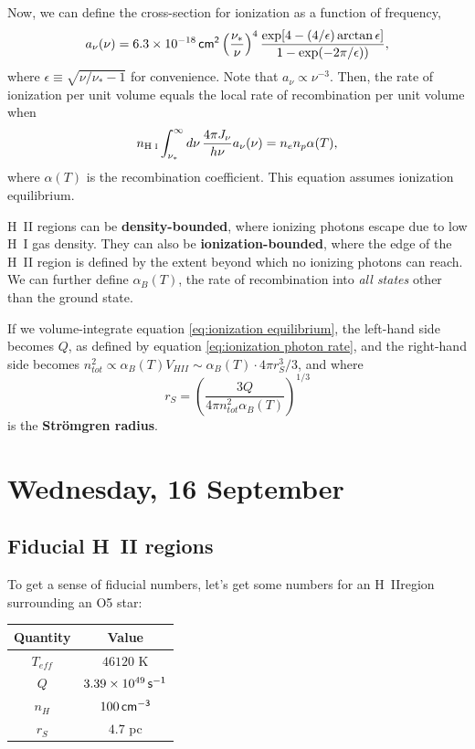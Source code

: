 \documentclass{tufte-handout}
\renewcommand{\textbf}[1]{{\bf \textcolor{dark-gray}{#1}}}
\renewcommand{\rm}{\sf}
\newcommand{\HI}{\textnormal{H{\smaller~\textsc{I}}}}
\newcommand{\HII}{\textnormal{H{\smaller~\textsc{II}}}}
\begin{document}
Now, we can define the cross-section for ionization as a function of frequency,
\begin{equation}
a_\nu(\nu) = 6.3 \times 10^{-18} {\rm\, cm^2} \left (\frac{\nu_*}{\nu}\right )^4 \frac{\exp[4 -(4/\epsilon)\arctan \epsilon]}{1 - \exp(-2\pi/\epsilon))},
\end{equation}
where $\epsilon \equiv \sqrt{\nu / \nu_* - 1}$ for convenience. Note that $a_\nu \propto \nu^{-3}$. Then, the rate of ionization per unit volume equals the local rate of recombination per unit volume when
\begin{equation}
\label{eq:ionization equilibrium}
n_{\HI}\int_{\nu_*}^\infty d\nu\, \frac{4\pi J_\nu}{h \nu} a_\nu(\nu) = n_e n_p \alpha(T),
\end{equation}
where $\alpha(T)$ is the recombination coefficient. This equation assumes ionization equilibrium.

\HII{} regions can be \textbf{density-bounded}, where ionizing photons escape due to low \HI{} gas density. They can also be \textbf{ionization-bounded}, where the edge of the \HII{} region is defined by the extent beyond which no ionizing photons can reach. We can further define $\alpha_B(T)$, the rate of recombination into \textit{all states} other than the ground state. 

If we volume-integrate equation \eqref{eq:ionization equilibrium}, the left-hand side becomes $Q$, as defined by equation \eqref{eq:ionization photon rate}, and the right-hand side becomes $n_{tot}^2 \propto \alpha_B(T) V_{HII} \sim \alpha_B(T) \cdot 4 \pi r_S^3/3$, and where 
\begin{equation}
r_S = \left (\frac{3Q}{4\pi n_{tot}^2 \alpha_B(T)}\right )^{1/3}
\end{equation}
is the \textbf{Str\"omgren radius}.


\section{Wednesday, 16 September}

\subsection{Fiducial \HII{} regions}
To get a sense of fiducial numbers, let's get some numbers for an \HII region surrounding an O5 star:

\begin{tabular}{cc}
Quantity & Value\\
\hline
$T_{eff}$ & $46120$ K\\
$Q$ & $3.39\times 10^{49}\, {\rm s^{-1}}$\\
$n_H$ & $100\rm \, cm^{-3}$\\
$r_S$ & $4.7$ pc
\end{tabular}
\end{document}
